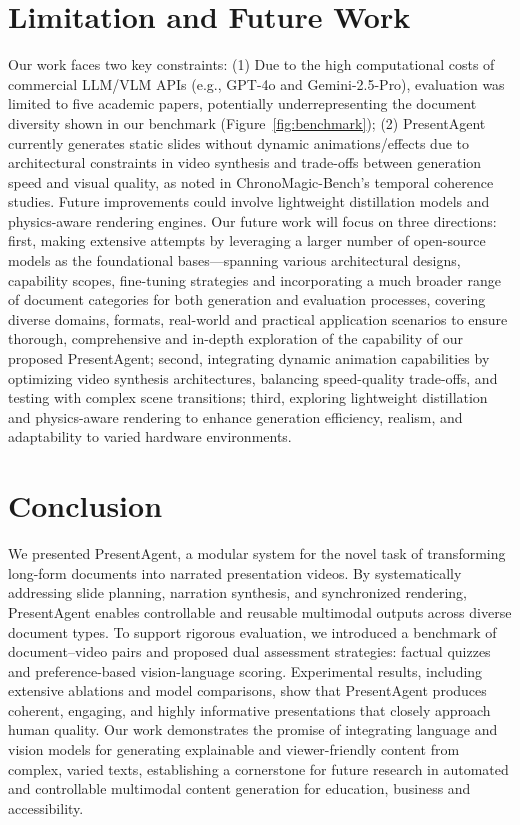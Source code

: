 \documentclass[11pt]{article}
\begin{document}
\section{Limitation and Future Work}
Our work faces two key constraints: (1) Due to the high computational costs of commercial LLM/VLM APIs (e.g., GPT-4o and Gemini-2.5-Pro), evaluation was limited to five academic papers, potentially underrepresenting the document diversity shown in our benchmark (Figure~\ref{fig:benchmark}); (2) PresentAgent currently generates static slides without dynamic animations/effects due to architectural constraints in video synthesis and trade-offs between generation speed and visual quality, as noted in ChronoMagic-Bench's temporal coherence studies. Future improvements could involve lightweight distillation models and physics-aware rendering engines.
Our future work will focus on three directions: first, making extensive attempts by leveraging a larger number of open-source models as the foundational bases—spanning various architectural designs, capability scopes, fine-tuning strategies and incorporating a much broader range of document categories for both generation and evaluation processes, covering diverse domains, formats, real-world and practical application scenarios to ensure thorough, comprehensive and in-depth exploration of the capability of our proposed PresentAgent; second, integrating dynamic animation capabilities by optimizing video synthesis architectures, balancing speed-quality trade-offs, and testing with complex scene transitions; third, exploring lightweight distillation and physics-aware rendering to enhance generation efficiency, realism, and adaptability to varied hardware environments.



\section{Conclusion}

We presented PresentAgent, a modular system for the novel task of transforming long-form documents into narrated presentation videos. By systematically addressing slide planning, narration synthesis, and synchronized rendering, PresentAgent enables controllable and reusable multimodal outputs across diverse document types. To support rigorous evaluation, we introduced a benchmark of document–video pairs and proposed dual assessment strategies: factual quizzes and preference-based vision-language scoring. Experimental results, including extensive ablations and model comparisons, show that PresentAgent produces coherent, engaging, and highly informative presentations that closely approach human quality. Our work demonstrates the promise of integrating language and vision models for generating explainable and viewer-friendly content from complex, varied texts, establishing a cornerstone for future research in automated and controllable multimodal content generation for education, business and accessibility.


\clearpage

\end{document}
